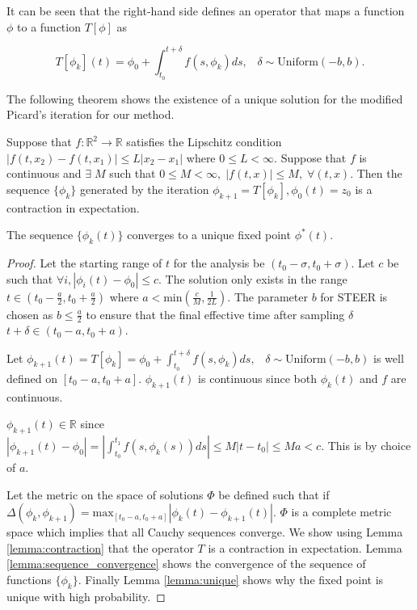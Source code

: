 It can be seen that the right-hand side  defines an operator that maps a function $\phi$ to a function $T[\phi]$ as

\begin{equation}
	T[\phi_k](t) = \phi_0 + \int_{t_0}^{t + \delta} f(s,\phi_k) ds , \; \; \; \delta \sim \text{Uniform}(-b,b).
	\label{picard_operator}
\end{equation}

The following theorem shows the existence of a unique solution for the modified Picard's iteration for our method. 
\begin{theorem}
	Suppose that $f: \mathbb{R}^{2} \rightarrow \mathbb{R}$ satisfies the Lipschitz  condition   $| f(t,x_2) - f(t,x_1) | \leq L |x_2-x_1|$ where $ 0 \leq L < \infty$. Suppose that $f$ is continuous and $\exists \; M$  such that $0\leq M <\infty , \; |f (t, x)| \leq M ,\; \forall(t,x)$. 
	Then the sequence $\{\phi_k \}$ generated by the iteration  $\phi_{k+1}=T[\phi_k], \phi_0(t) = z_0$ is a contraction in expectation. 
	
	The sequence $ \{ \phi_k(t) \} $ converges to a unique fixed point $\phi^*(t)$.
	\label{theorem:picard}
\end{theorem}


\begin{proof}
	Let the starting range of $t$ for the analysis be $(t_0- \sigma , t_0+ \sigma )$. Let $c$ be such that $\forall i, |\phi_i(t)-\phi_0| \leq c$. The solution only exists in the range $t \in (t_0-\frac{a}{2}, t_0+\frac{a}{2})$ where $a<\text{min}(\frac{c}{M},\frac{1}{2L})$. The parameter $b$ for STEER is chosen as $b \leq \frac{a}{2}$ to ensure that the final effective time after sampling $\delta$ $t + \delta \in (t_0-a,t_0+a)$.
	
	Let $\phi_{k+1}(t) = T[\phi_k] = \phi_0 + \int_{t_0}^{t + \delta} f(s,\phi_k) ds , \; \; \; \delta \sim \text{Uniform}(-b,b)$ is well defined on $[t_0-a,t_0+a]$. $\phi_{k+1}(t)$ is continuous since both $\phi_k(t)$ and $f$ are continuous.
	
	$\phi_{k+1}(t)\in\mathbb{R}$ since $| \phi_{k+1}(t)-\phi_0|=|\int_{t_0}^{t_1}f(s,\phi_k(s))ds| \leq M|t-t_0| \leq Ma < c$. This is by choice of $a$.
	
	Let the metric on the space of solutions $\Phi$ be defined such that if $\Delta(\phi_{k},\phi_{k+1})=\text{max}_{[t_0-a,t_0+a]}|\phi_{k}(t)-\phi_{k+1}(t)|$. $\Phi$ is a complete metric space which implies that all Cauchy sequences converge. We show using Lemma \ref{lemma:contraction} that the operator $T$ is a contraction in expectation. Lemma \ref{lemma:sequence_convergence} shows the convergence of the sequence of functions $\{\phi_k\}$. Finally Lemma \ref{lemma:unique} shows why the fixed point is unique with high probability.
\end{proof}

